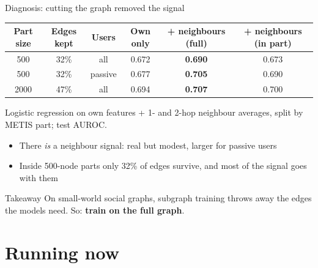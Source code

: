 \documentclass[aspectratio=169,10pt]{beamer}
\newcommand{\snote}[1]{{\scriptsize\textcolor{ink!70}{#1}}}
\begin{document}
\begin{frame}{Diagnosis: cutting the graph removed the signal}
  \centering\small
  \begin{tabular}{@{}cccccc@{}}
    \toprule
    Part size & Edges kept & Users & Own only & + neighbours (full) & + neighbours (in part) \\
    \midrule
    500 & 32\% & all & 0.672 & \textbf{0.690} & 0.673 \\
    500 & 32\% & passive & 0.677 & \textbf{0.705} & 0.690 \\
    2000 & 47\% & all & 0.694 & \textbf{0.707} & 0.700 \\
    \bottomrule
  \end{tabular}

  \snote{Logistic regression on own features + 1- and 2-hop neighbour averages, split by METIS part; test AUROC.}
  \vspace{0.4em}
  \raggedright
  \begin{itemize}\small
    \item There \emph{is} a neighbour signal: real but modest, larger for passive users
    \item Inside 500-node parts only 32\% of edges survive, and most of the signal goes with them
  \end{itemize}
  \begin{exampleblock}{Takeaway}
    On small-world social graphs, subgraph training throws away the edges the models need. So: \textbf{train on the full graph}.
  \end{exampleblock}
\end{frame}

\section{Running now}
\end{document}
